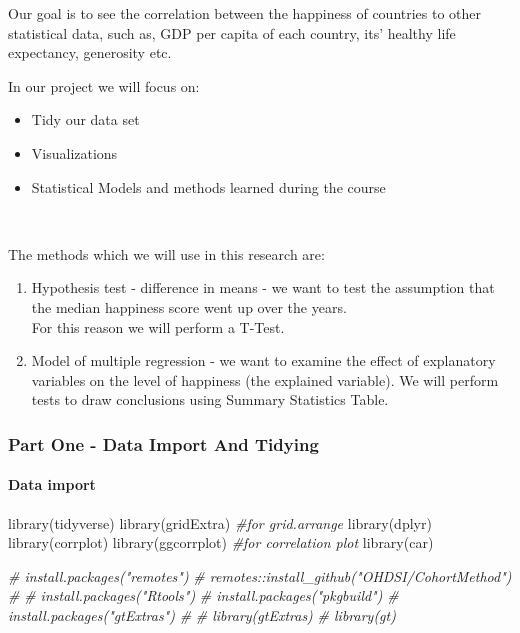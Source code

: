 \documentclass[
]{article}
\newenvironment{Shaded}{\begin{snugshade}}{\end{snugshade}}
\newcommand{\CommentTok}[1]{\textcolor[rgb]{0.56,0.35,0.01}{\textit{#1}}}
\newcommand{\FunctionTok}[1]{\textcolor[rgb]{0.00,0.00,0.00}{#1}}
\newcommand{\NormalTok}[1]{#1}
\providecommand{\tightlist}{%
  \setlength{\itemsep}{0pt}\setlength{\parskip}{0pt}}
\begin{document}
Our goal is to see the correlation between the happiness of countries to
other statistical data, such as, GDP per capita of each country, its'
healthy life expectancy, generosity etc.

\hfill\break
In our project we will focus on:\\

\begin{itemize}
\tightlist
\item
  Tidy our data set
\item
  Visualizations
\item
  Statistical Models and methods learned during the course\\
  \strut \\
\end{itemize}

The methods which we will use in this research are:

\begin{enumerate}
\def\labelenumi{\arabic{enumi}.}
\item
  Hypothesis test - difference in means - we want to test the assumption
  that the median happiness score went up over the years.\\
  For this reason we will perform a T-Test.
\item
  Model of multiple regression - we want to examine the effect of
  explanatory variables on the level of happiness (the explained
  variable). We will perform tests to draw conclusions using Summary
  Statistics Table.
\end{enumerate}

\hfill\break

\hypertarget{part-one---data-import-and-tidying}{%
\subsubsection{Part One - Data Import And
Tidying}\label{part-one---data-import-and-tidying}}

\hfill\break

\hypertarget{data-import}{%
\paragraph{Data import}\label{data-import}}

\begin{Shaded}
\begin{Highlighting}[]
\FunctionTok{library}\NormalTok{(tidyverse)}
\FunctionTok{library}\NormalTok{(gridExtra) }\CommentTok{\#for grid.arrange}
\FunctionTok{library}\NormalTok{(dplyr)}
\FunctionTok{library}\NormalTok{(corrplot)}
\FunctionTok{library}\NormalTok{(ggcorrplot) }\CommentTok{\#for correlation plot}
\FunctionTok{library}\NormalTok{(car)}

\CommentTok{\# install.packages("remotes")}
\CommentTok{\# remotes::install\_github("OHDSI/CohortMethod")}
\CommentTok{\# }
\CommentTok{\# install.packages("Rtools")}
\CommentTok{\# install.packages("pkgbuild")}
\CommentTok{\# install.packages("gtExtras")}
\CommentTok{\# }
\CommentTok{\# library(gtExtras)}
\CommentTok{\# library(gt)}
\end{Highlighting}
\end{Shaded}
\end{document}
